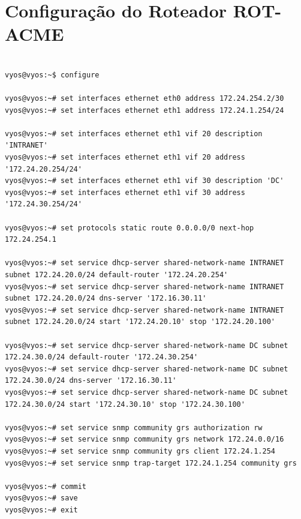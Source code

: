 \clearpage
\onecolumn

\appendices

\section{Configuração do Roteador ROT-ACME}

\begin{listing}[H]
\centering
\begin{verbatim}

vyos@vyos:~$ configure

vyos@vyos:~# set interfaces ethernet eth0 address 172.24.254.2/30
vyos@vyos:~# set interfaces ethernet eth1 address 172.24.1.254/24 

vyos@vyos:~# set interfaces ethernet eth1 vif 20 description 'INTRANET'
vyos@vyos:~# set interfaces ethernet eth1 vif 20 address '172.24.20.254/24'
vyos@vyos:~# set interfaces ethernet eth1 vif 30 description 'DC'
vyos@vyos:~# set interfaces ethernet eth1 vif 30 address '172.24.30.254/24'

vyos@vyos:~# set protocols static route 0.0.0.0/0 next-hop 172.24.254.1

vyos@vyos:~# set service dhcp-server shared-network-name INTRANET subnet 172.24.20.0/24 default-router '172.24.20.254'
vyos@vyos:~# set service dhcp-server shared-network-name INTRANET subnet 172.24.20.0/24 dns-server '172.16.30.11'
vyos@vyos:~# set service dhcp-server shared-network-name INTRANET subnet 172.24.20.0/24 start '172.24.20.10' stop '172.24.20.100'

vyos@vyos:~# set service dhcp-server shared-network-name DC subnet 172.24.30.0/24 default-router '172.24.30.254'
vyos@vyos:~# set service dhcp-server shared-network-name DC subnet 172.24.30.0/24 dns-server '172.16.30.11'
vyos@vyos:~# set service dhcp-server shared-network-name DC subnet 172.24.30.0/24 start '172.24.30.10' stop '172.24.30.100'

vyos@vyos:~# set service snmp community grs authorization rw
vyos@vyos:~# set service snmp community grs network 172.24.0.0/16
vyos@vyos:~# set service snmp community grs client 172.24.1.254
vyos@vyos:~# set service snmp trap-target 172.24.1.254 community grs

vyos@vyos:~# commit
vyos@vyos:~# save
vyos@vyos:~# exit 

\end{verbatim}
\caption{Configuração de Roteador ROT-ACME}
\label{lst:rotacme}
\end{listing}


